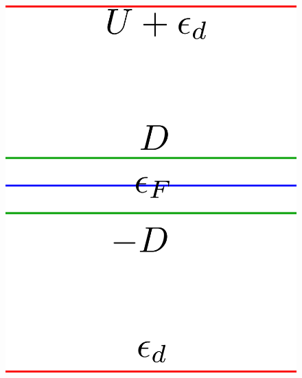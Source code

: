 \documentclass[14pt]{extarticle}
\numberwithin{equation}{section}
\begin{document}
\begin{figure}
\begin{minipage}{220pt}
	\centering
       	\includegraphics[scale=0.28]{anderson.png}
       	\label{and1}
\end{minipage}
\begin{minipage}{220pt}
	\centering

\end{minipage}
\end{figure}
\end{document}
